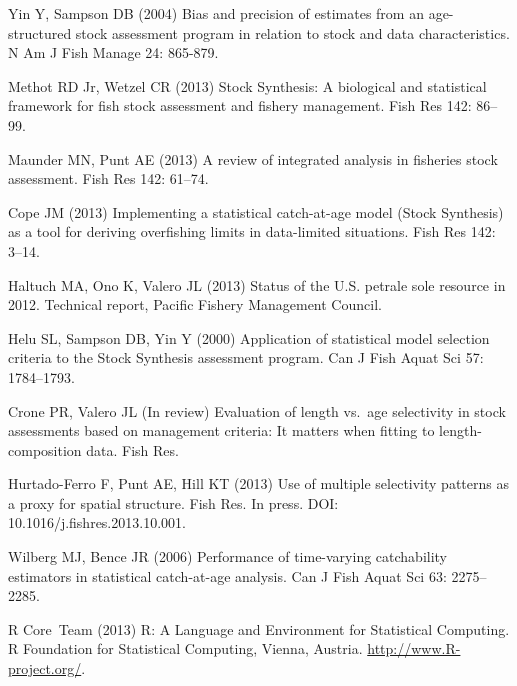 \documentclass[10pt]{article}
\begin{document}
\begin{thebibliography}{10}
Yin Y, Sampson DB (2004) Bias and precision of estimates from an age-structured
  stock assessment program in relation to stock and data characteristics.
\newblock N Am J Fish Manage 24: 865-879.

Methot RD Jr, Wetzel CR (2013) {Stock Synthesis}: A biological and statistical
  framework for fish stock assessment and fishery management.
\newblock Fish Res 142: 86--99.

Maunder MN, Punt AE (2013) A review of integrated analysis in fisheries stock
  assessment.
\newblock Fish Res 142: 61--74.

Cope JM (2013) Implementing a statistical catch-at-age model ({Stock
  Synthesis}) as a tool for deriving overfishing limits in data-limited
  situations.
\newblock Fish Res 142: 3--14.

Haltuch MA, Ono K, Valero JL (2013) Status of the {U.S.} petrale sole resource
  in 2012.
\newblock Technical report, Pacific Fishery Management Council.

Helu SL, Sampson DB, Yin Y (2000) Application of statistical model selection
  criteria to the {Stock Synthesis} assessment program.
\newblock Can J Fish Aquat Sci 57: 1784--1793.

Crone PR, Valero JL (In review) Evaluation of length vs.~age selectivity in
  stock assessments based on management criteria: It matters when fitting to
  length-composition data.
\newblock Fish Res.

Hurtado-Ferro F, Punt AE, Hill KT (2013) Use of multiple selectivity patterns
  as a proxy for spatial structure.
\newblock Fish Res. In press. DOI: 10.1016/j.fishres.2013.10.001.

Wilberg MJ, Bence JR (2006) Performance of time-varying catchability estimators
  in statistical catch-at-age analysis.
\newblock Can J Fish Aquat Sci 63: 2275--2285.

\textsf{R} Core~Team (2013) \textsf{R}: A Language and Environment for
  Statistical Computing.
\newblock \textsf{R} Foundation for Statistical Computing, Vienna, Austria.
\newblock \urlprefix\url{http://www.R-project.org/}.


\end{thebibliography}
\end{document}
